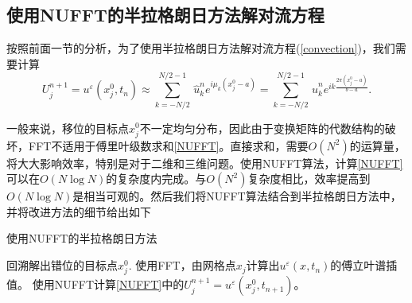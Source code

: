 \subsection{使用NUFFT的半拉格朗日方法解对流方程}
按照前面一节的分析，为了使用半拉格朗日方法解对流方程(\ref{convection})，我们需要计算
\begin{equation}\label{NUFFT}
    U^{n+1}_j=u^{\varepsilon}(x^0_j,t_{n}) \approx \sum^{N/2-1}_{k=-N/2}\,\hat{u}^n_k e^{i\mu_k(x^0_j-a)} = \sum^{N/2-1}_{k=-N/2}\,\hat{u}^n_k e^{i k \frac{2\pi (x^0_j-a) }{b-a}}.
\end{equation}


一般来说，移位的目标点$x^0_j$不一定均匀分布，因此由于变换矩阵的代数结构的破坏，FFT不适用于傅里叶级数求和\eqref{NUFFT}。直接求和，需要$O(N^2)$的运算量，将大大影响效率，特别是对于二维和三维问题。使用NUFFT算法，计算\eqref{NUFFT}可以在$O(N\log N)$的复杂度内完成。与$O(N^{2})$复杂度相比，效率提高到$O(N\log N)$是相当可观的。然后我们将NUFFT算法结合到半拉格朗日方法中，并将改进方法的细节给出如下

\begin{algorithm}
\caption{使用NUFFT的半拉格朗日方法}
\label{alg1}
\begin{algorithmic}[1]
\State 回溯解出错位的目标点$x_j^0$. 
\State 使用FFT，由网格点$x_j$计算出$u^{\varepsilon}(x,t_{n})$的傅立叶谱插值。
\State 使用NUFFT计算\eqref{NUFFT}中的$U^{n+1}_{j}= u^{\varepsilon}(x_j^0,t_{n+1})$。
\end{algorithmic}
\end{algorithm}


